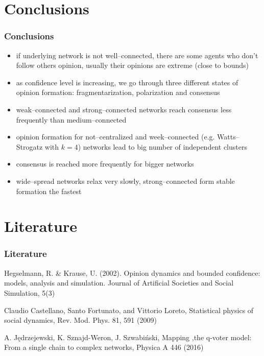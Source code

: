 \documentclass[a4paper, 11pt]{beamer}
\begin{document}
\section{Conclusions}
\begin{frame}
\frametitle{Conclusions}
\begin{itemize}
	\item if underlying network is not well--connected, there are some agents who don't follow others opinion, usually their opinions are extreme (close to bounds)
	\item as confidence level is increasing, we go through three different states of opinion formation: fragmentarization, polarization and consensus
	\item weak--connected and strong--connected networks reach consensus less frequently than medium--connected
	\item opinion formation for not--centralized and week--connected (e.g. Watts--Strogatz with $k=4$) networks lead to big number of independent clusters
	\item consensus is reached more frequently for bigger networks
	\item wide--spread networks relax very slowly, strong--connected form stable formation the fastest
\end{itemize}
\end{frame}

\section{Literature}
\begin{frame}
\frametitle{Literature}
\begin{thebibliography}{1}


 Hegselmann, R. \& Krause, U. (2002). Opinion dynamics and bounded confidence: models, analysis and simulation. Journal of Artificial Societies and Social Simulation, 5(3)

 Claudio Castellano, Santo Fortunato, and Vittorio Loreto, Statistical physics of social dynamics, Rev. Mod. Phys. 81, 591 (2009)

 A. Jędrzejewski, K. Sznajd-Weron, J. Szwabiński, Mapping ,the q-voter model: From a single chain to complex networks, Physica A 446 (2016)

\end{thebibliography}
\end{frame}
\end{document}
